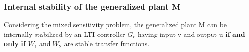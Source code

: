 \documentclass[a4paper,10pt,titlepage]{article}
\numberwithin{equation}{subsection}
\begin{document}
	\subsubsection{Internal stability of the generalized plant $\bm{M}$}
	Considering the mixed sensitivity problem, the generalized plant M can be internally stabilized by an LTI controller $G_c$ having input v and output u \textbf{if and only if} $W_1$ and $W_2$ are stable transfer functions.
	
	
	
	
	
\end{document}
